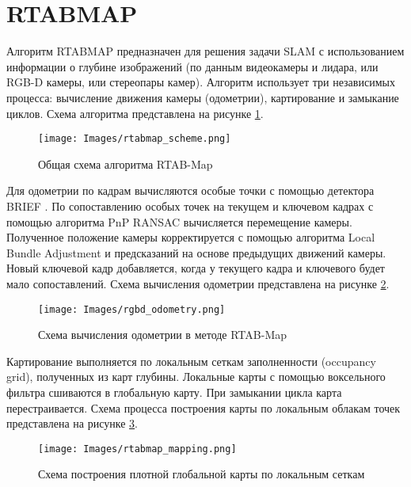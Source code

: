 \documentclass{mipt-thesis-bs}
\begin{document}
\section{RTABMAP}
\label{section_rtabmap}

Алгоритм RTABMAP \cite{labbe2011memory} предназначен для решения задачи SLAM с использованием информации о глубине изображений (по данным видеокамеры и лидара, или RGB-D камеры, или стереопары камер). Алгоритм использует три независимых процесса: вычисление движения камеры (одометрии), картирование и замыкание циклов. Схема алгоритма представлена на рисунке \ref{figurertabmap}.

\begin{figure}
	\centering
	\texttt{[image: Images/rtabmap\_scheme.png]}
	\caption{Общая схема алгоритма RTAB-Map}
	\label{figurertabmap}
\end{figure}

Для одометрии по кадрам вычисляются особые точки с помощью детектора BRIEF \cite{calonder2010brief}. По сопоставлению особых точек на текущем и ключевом кадрах с помощью алгоритма PnP RANSAC \cite{brachmann2017dsac} вычисляется перемещение камеры. Полученное положение камеры корректируется с помощью алгоритма Local Bundle Adjustment \cite{zhang2006incremental} и предсказаний на основе предыдущих движений камеры. Новый ключевой кадр добавляется, когда у текущего кадра и ключевого будет мало сопоставлений. Схема вычисления одометрии представлена на рисунке \ref{figurergbdodometry}.

\begin{figure}
	\centering
	\texttt{[image: Images/rgbd\_odometry.png]}
	\caption{Схема вычисления одометрии в методе RTAB-Map}
	\label{figurergbdodometry}
\end{figure}

Картирование выполняется по локальным сеткам заполненности (occupancy grid), полученных из карт глубины. Локальные карты с помощью воксельного фильтра сшиваются в глобальную карту. При замыкании цикла карта перестраивается. Схема процесса построения карты по локальным облакам точек представлена на рисунке \ref{figuremapping}.

\begin{figure}
	\centering
	\texttt{[image: Images/rtabmap\_mapping.png]}
	\caption{Схема построения плотной глобальной карты по локальным сеткам}
	\label{figuremapping}
\end{figure}
\end{document}
